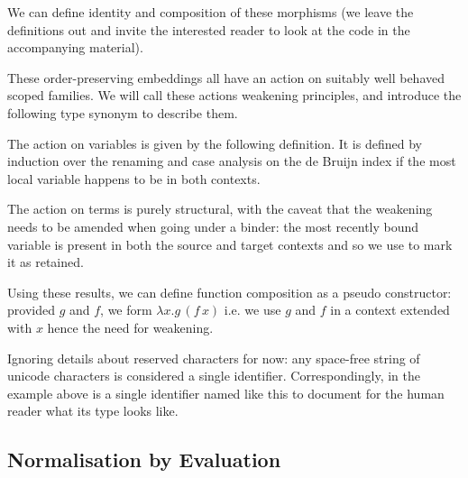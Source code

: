 We can define identity and composition of these morphisms (we leave
the definitions out and invite the interested reader to look
at the code in the accompanying material).

\noindent
\begin{minipage}{.15\textwidth}
\end{minipage}\hfill
\begin{minipage}{.27\textwidth}
\end{minipage}

These order-preserving embeddings all have an action on suitably
well behaved scoped families. We will call these actions weakening
principles, and introduce the following type synonym to describe them.


The action on variables is given
by the following  definition. It is defined by
induction over the renaming and case analysis on the de Bruijn
index if the most local variable happens to be in both contexts.


The action on terms is purely structural, with the caveat that
the weakening needs to be amended when going under a binder: the
most recently bound variable is present in both the source and
target contexts and so we use  to mark it as retained.


Using these results, we can define function composition
as a pseudo constructor: provided $g$ and $f$, we form
$λx.g\,(f\, x)$ i.e. we use $g$ and $f$ in a context extended
with $x$ hence the need for weakening.

\label{def:composition}

\begin{remark}
  Ignoring details about reserved characters for now: any
  space-free string of unicode characters is considered a
  single identifier.
  Correspondingly, in the example above  is a single
  identifier named like this to document for the human reader
  what its type looks like.
\end{remark}

\subsection{Normalisation by Evaluation}

